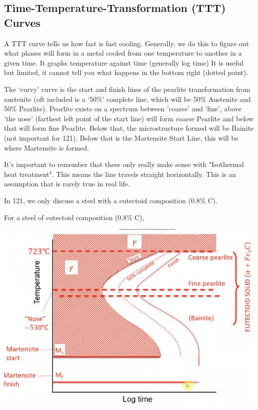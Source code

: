 \documentclass[12pt]{article}
\begin{document}
\subsection{Time-Temperature-Transformation (TTT) Curves }
A TTT curve tells us how fast is fast cooling. 
Generally, we do this to figure out what phases will form in a metal cooled from one temperature to another in a given time. 
It graphs temperature against time (generally log time)
It is useful but limited, it cannot tell you what happens in the bottom right (dotted point).  

The `curvy' curve is the start and finish lines of the pearlite transformation from austenite (oft included is a `50\%' complete line, which will be 50\% Austenite and 50\% Pearlite).
Pearlite exists on a spectrum between 'coarse' and 'fine', above 'the nose' (farthest left point of the start line) will form coarse Pearlite and below that will form fine Pearlite. 
Below that, the microstructure formed will be Bainite (not important for 121).
Below that is the Martensite Start Line, this will be where Martensite is formed.

It's important to remember that these only really make sense with "Isothermal heat treatment". 
This means the line travels straight horizontally. 
This is an assumption that is rarely true in real life.

\begin{theorem*}
In 121, we only discuss a steel with a eutectoid composition (0.8\% C).
\end{theorem*}

For a steel of eutectoid composition (0.8\% C),
\begin{center}
\includegraphics[scale=0.5]{ttt}
\end{center}
\end{document}
